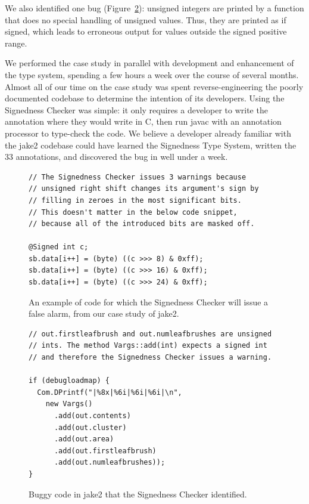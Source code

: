 \documentclass{sig-alternate-05-2015}
\def\<#1>{\codeid{#1}}
\begin{document}
We also identified one bug (Figure~\ref{fig:bug}):
unsigned integers are printed by a function that does no special handling
of unsigned values.  Thus, they are printed as
if signed, which leads to erroneous output for values outside the signed
positive range.

We performed the case study in parallel with development and enhancement of
the type system, spending a few hours a week over the course of several months.
Almost all of our time on the case study
was spent reverse-engineering the poorly documented codebase to determine
the intention of its developers. Using
the Signedness Checker was simple:  it only requires a developer to
write the \<@Unsigned> annotation where they would write \<unsigned
int> in C,
then run javac with an annotation processor to type-check the code.
We believe a developer already familiar with the jake2 codebase could have
learned the Signedness Type System,
written the 33 annotations, and discovered the bug in well under a week.

\begin{figure}[t]
\begin{lstlisting}
// The Signedness Checker issues 3 warnings because
// unsigned right shift changes its argument's sign by
// filling in zeroes in the most significant bits.
// This doesn't matter in the below code snippet,
// because all of the introduced bits are masked off.

@Signed int c;
sb.data[i++] = (byte) ((c >>> 8) & 0xff);
sb.data[i++] = (byte) ((c >>> 16) & 0xff);
sb.data[i++] = (byte) ((c >>> 24) & 0xff);

\end{lstlisting}
\vspace{-10pt}
\caption{An example of code for which the Signedness Checker will issue a false
alarm, from our case study of jake2.}
\label{fig:false-alarm}
\end{figure}

\begin{figure}[t]
\begin{lstlisting}
// out.firstleafbrush and out.numleafbrushes are unsigned
// ints. The method Vargs::add(int) expects a signed int
// and therefore the Signedness Checker issues a warning.

if (debugloadmap) {
  Com.DPrintf("|%8x|%6i|%6i|%6i|\n",
    new Vargs()
      .add(out.contents)
      .add(out.cluster)
      .add(out.area)
      .add(out.firstleafbrush)
      .add(out.numleafbrushes));
}

\end{lstlisting}
\vspace{-10pt}
\caption{Buggy code in jake2 that the Signedness Checker identified.}
\label{fig:bug}
\end{figure}
\end{document}
